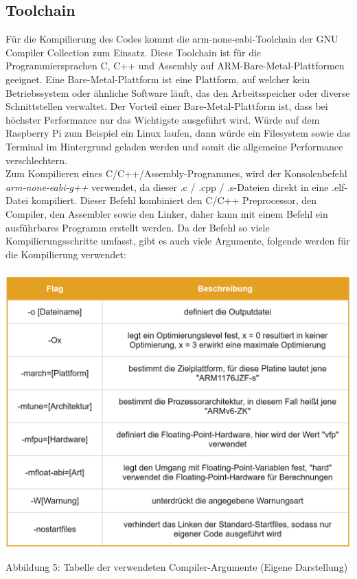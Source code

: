 \documentclass[12pt]{article}
\begin{document}
\subsection{Toolchain}
Für die Kompilierung des Codes kommt die arm-none-eabi-Toolchain der GNU Compiler Collection zum Einsatz. Diese Toolchain ist für die Programmiersprachen C, C++ und Assembly auf ARM-Bare-Metal-Plattformen geeignet. Eine Bare-Metal-Plattform ist eine Plattform, auf welcher kein Betriebssystem oder ähnliche Software läuft, das den Arbeitsspeicher oder diverse Schnittstellen verwaltet. Der Vorteil einer Bare-Metal-Plattform ist, dass bei höchster Performance nur das Wichtigste ausgeführt wird. Würde auf dem Raspberry Pi zum Beispiel ein Linux laufen, dann würde ein Filesystem sowie das Terminal im Hintergrund geladen werden und somit die allgemeine Performance verschlechtern.
\\Zum Kompilieren eines C/C++/Assembly-Programmes, wird der Konsolenbefehl \textit{arm-none-eabi-g++} verwendet, da dieser .c / .cpp / .s-Dateien direkt in eine .elf-Datei kompiliert. Dieser Befehl kombiniert den C/C++ Preprocessor, den Compiler, den Assembler sowie den Linker, daher kann mit einem Befehl ein ausführbares Programm erstellt werden. Da der Befehl so viele Kompilierungsschritte umfasst, gibt es auch viele Argumente, folgende werden für die Kompilierung verwendet:\\\\
\includegraphics[width=\textwidth]{img/flags.PNG}
\begin{center}
\vspace{-5mm}
Abbildung 5: Tabelle der verwendeten Compiler-Argumente (Eigene Darstellung)
\end{center}
\end{document}
